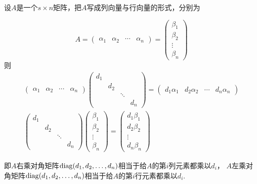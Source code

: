 \begin{theorem}
    设$A$是一个$s \times n$矩阵，把$A$写成列向量与行向量的形式，分别为

    \[ A = \begin{pmatrix}\alpha_1 & \alpha_2 & \cdots & \alpha_n\end{pmatrix} = \begin{pmatrix} \beta_1 \\ \beta_2 \\ \vdots \\ \beta_n \end{pmatrix} \]
    则
    \begin{gather*}
        \begin{pmatrix}\alpha_1 & \alpha_2 & \cdots & \alpha_n\end{pmatrix}
        \begin{pmatrix}
            d_1 & & & \\
            & d_2 & & \\
            & & \ddots & \\
            & & & d_n
        \end{pmatrix} = \begin{pmatrix}d_1\alpha_1 & d_2\alpha_2 & \cdots & d_n\alpha_n\end{pmatrix} \\
        \begin{pmatrix}
            d_1 & & & \\
            & d_2 & & \\
            & & \ddots & \\
            & & & d_n
        \end{pmatrix} \begin{pmatrix} \beta_1 \\ \beta_2 \\ \vdots \\ \beta_n \end{pmatrix} = \begin{pmatrix} d_1\beta_1 \\ d_2\beta_2 \\ \vdots \\ d_n\beta_n \end{pmatrix}
    \end{gather*}

    即$A$右乘对角矩阵$\operatorname{diag}(d_1,d_2,\ldots,d_n)$相当于给$A$的第$i$列元素都乘以$d_i$，
    $A$左乘对角矩阵$\operatorname{diag}(d_1,d_2,\ldots,d_n)$相当于给$A$的第$i$行元素都乘以$d_i$.
\end{theorem}
